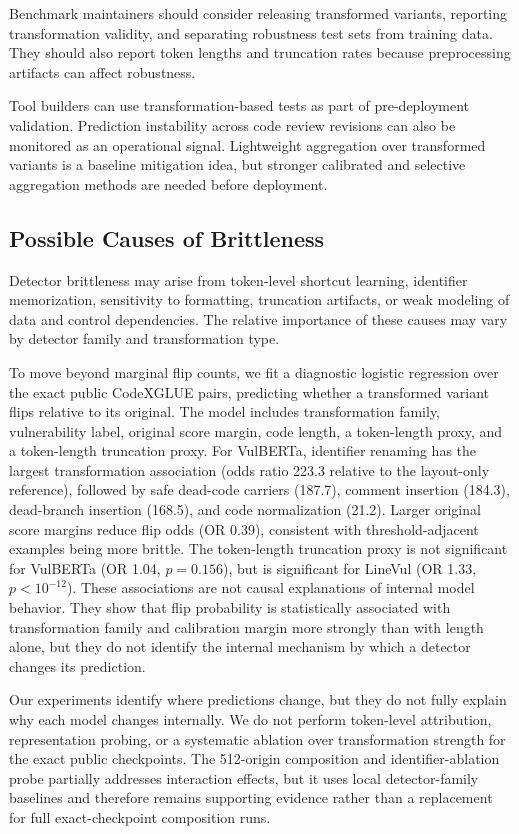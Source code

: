 \documentclass[a4paper,fleqn]{cas-dc}
\begin{document}
Benchmark maintainers should consider releasing transformed variants, reporting
transformation validity, and separating robustness test sets from training
data. They should also report token lengths and truncation rates because
preprocessing artifacts can affect robustness.

Tool builders can use transformation-based tests as part of pre-deployment
validation. Prediction instability across code review revisions can also be
monitored as an operational signal. Lightweight aggregation over transformed
variants is a baseline mitigation idea, but stronger calibrated and selective
aggregation methods are needed before deployment.

\subsection{Possible Causes of Brittleness}
\label{sec:mechanism-analysis}

Detector brittleness may arise from token-level shortcut learning, identifier
memorization, sensitivity to formatting, truncation artifacts, or weak modeling
of data and control dependencies. The relative importance of these causes may
vary by detector family and transformation type.

To move beyond marginal flip counts, we fit a diagnostic logistic regression
over the exact public CodeXGLUE pairs, predicting whether a transformed variant
flips relative to its original. The model includes transformation family,
vulnerability label, original score margin, code length, a token-length proxy,
and a token-length truncation proxy. For VulBERTa, identifier renaming has the
largest transformation association (odds ratio 223.3 relative to the
layout-only reference), followed by safe dead-code carriers (187.7), comment
insertion (184.3), dead-branch insertion (168.5), and code normalization
(21.2). Larger original score margins reduce flip odds (OR 0.39), consistent
with threshold-adjacent examples being more brittle. The token-length
truncation proxy is not significant for VulBERTa (OR 1.04, $p=0.156$), but is
significant for LineVul (OR 1.33, $p<10^{-12}$). These associations are not
causal explanations of internal model behavior. They show that flip probability
is statistically associated with transformation family and calibration margin
more strongly than with length alone, but they do not identify the internal
mechanism by which a detector changes its prediction.

Our experiments identify where predictions change, but they do not fully
explain why each model changes internally. We do not perform token-level
attribution, representation probing, or a systematic ablation over
transformation strength for the exact public checkpoints. The 512-origin
composition and identifier-ablation probe partially addresses interaction
effects, but it uses local detector-family baselines and therefore remains
supporting evidence rather than a replacement for full exact-checkpoint
composition runs.
\end{document}
